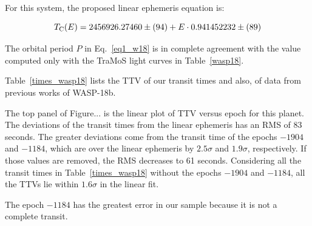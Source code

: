 
For this system, the proposed linear ephemeris equation is:

\begin{equation} \label{eq1_w18}
T_{\rm C}(E)=2456926.27460\pm(94)+E \cdot 0.941452232\pm(89)
\end{equation}

The orbital period $P$ in Eq.~\ref{eq1_w18} is in complete agreement with the value computed only with the TraMoS light curves in Table~\ref{wasp18}.

Table~\ref{times_wasp18} lists the TTV of our transit times and also, of data from previous works \citep{Triaud2010,Hellier2009,Maxted2013b} of WASP-18b. 

The top panel of Figure... is the linear plot of TTV versus epoch for this planet. The deviations of the transit times from the linear ephemeris has an RMS of 83 seconds. The greater deviations come from the transit time of the epochs $-1904$ and $-1184$, which are over the linear ephemeris by $2.5\sigma$ and $1.9\sigma$, respectively. If those values are removed, the RMS decreases to 61 seconds. Considering all the transit times in Table~\ref{times_wasp18} without the epochs $-1904$ and $-1184$, all the TTVs lie within $1.6\sigma$ in the linear fit. 

The epoch $-1184$ has the greatest error in our sample because it is not a complete transit.

